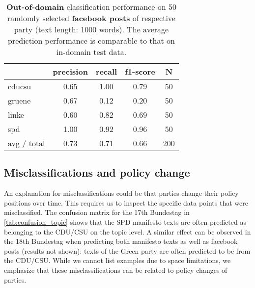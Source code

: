 \documentclass[11pt]{article}
\begin{document}
\begin{table}[t]
\caption{
\label{tab:results_fb}
{\bf  Out-of-domain} classification performance on 50 randomly selected {\bf facebook posts} of respective party (text length: 1000 words). The average prediction performance is comparable to that on in-domain test data.}
\begin{center}
\begin{tabular}{lcccc}
    &         precision    &recall &  f1-score  & N  \\
    \hline
        \hline
 cducsu     &  0.65     & 1.00  &    0.79     &   50\\
     gruene   &    0.67   &   0.12  &    0.20   &     50\\
      linke       &0.60    &  0.82    &  0.69    &    50\\
        spd       &1.00 &     0.92   &   0.96    &    50\\
\hline
avg / total    &   0.73   &   0.71  &    0.66   &    200\\
\end{tabular}
\end{center}

\end{table}


\subsection{Misclassifications and policy change}
An explanation for misclassifications could be that parties change their policy positions over time. This requires us to inspect the specific data points that were misclassified. The confusion matrix for the 17th Bundestag in \autoref{tab:confusion_topic} shows that the SPD manifesto texts are often predicted as belonging to the CDU/CSU on the topic level. A similar effect can be observed in the 18th Bundestag when predicting both manifesto texts as well as facebook posts (results not shown): texts of the Green party are often predicted to be from the CDU/CSU. While we cannot list examples due to space limitations, we emphasize that these misclassifications can be related to policy changes of parties. \\
\end{document}
